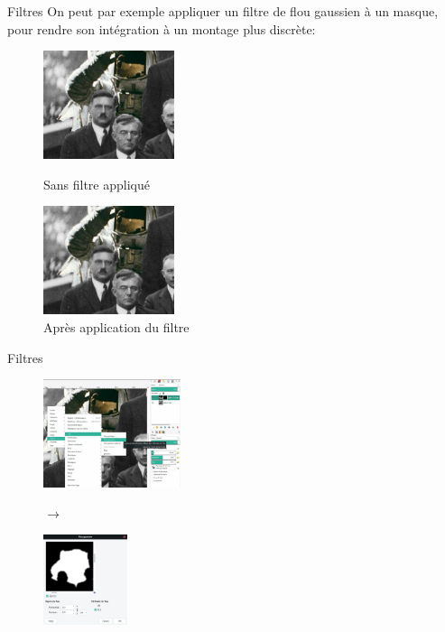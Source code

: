 \documentclass[10pt,svgnames,usenames,table]{beamer}
\begin{document}
\begin{frame}{Filtres}
		On peut par exemple appliquer un filtre de flou gaussien à un masque, pour rendre son intégration à un montage plus discrète:
		\begin{figure}[H]
			\centering
			\begin{minipage}{.5\textwidth}
				\centering
				\includegraphics[height=120px]{Images/filters/astro0} 
				\caption{Sans filtre appliqué}
			\end{minipage}%
			\begin{minipage}{.5\textwidth}
				\centering
				\includegraphics[height=120px]{Images/filters/astro1} 
				\caption{Après application du filtre}
			\end{minipage}
		\end{figure}		
\end{frame}		


	\begin{frame}{Filtres}
		\begin{figure}[H]
			\centering
			\begin{minipage}{.6\textwidth}
				\centering
				\includegraphics[height=120px]{Images/filters/astroBlur} 
				\end{minipage}$\rightarrow$%
			\begin{minipage}{.4\textwidth}
				\centering
				\includegraphics[height=100px]{Images/filters/gaussBlur} 
				\end{minipage}

			\end{figure}		
	\end{frame}
\end{document}
